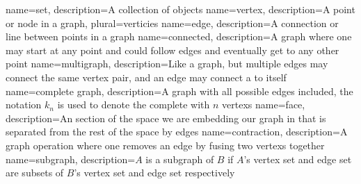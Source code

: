 \usepackage[toc,xindy]{glossaries}

\makenoidxglossaries

{
	name={set},
	description={A collection of objects}
}
{
	name={vertex},
	description={A point or node in a graph},
	plural={verticies}
}
{
	name={edge},
	description={A connection or line between points in a graph}
}
{
	name={connected},
	description={A graph where one may start at any point and could follow edges and eventually get to any other point}
}
{
	name={multigraph},
	description={Like a graph, but multiple \glspl{edge} may connect the same \gls{vertex} pair, and an edge may connect a  to itself}
}
{
	name={complete graph},
	description={A graph with all possible \glspl{edge} included, the notation $k_n$ is used to denote the \gls{complete} with $n$ \glspl{vertex}}
}
{
	name={face},
	description={An section of the space we are embedding our graph in that is separated from the rest of the space by \glspl{edge}}
}
{
	name={contraction},
	description={A graph operation where one removes an edge by fusing two \glspl{vertex} together}
}
{
	name={subgraph},
	description={$A$ is a \gls{subgraph} of $B$ if $A$'s \gls{vertex} \gls{set} and \gls{edge} \gls{set} are subsets of $B$'s \gls{vertex} \gls{set} and \gls{edge} \gls{set} respectively}
}
